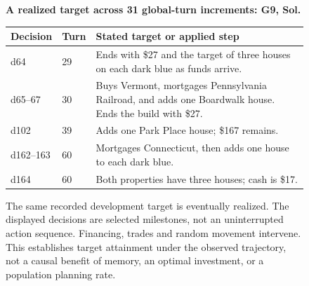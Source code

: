 
\begin{figure}[p]
\centering
\begin{minipage}{0.95\linewidth}
\textbf{A realized target across 31 global-turn increments: G9, Sol.}\par\smallskip
\begin{tabularx}{\linewidth}{@{}llX@{}}
\toprule
Decision & Turn & Stated target or applied step\\
\midrule
d64 & 29 & Ends with \$27 and the target of three houses on each dark blue as funds arrive.\\
d65--67 & 30 & Buys Vermont, mortgages Pennsylvania Railroad, and adds one Boardwalk house. Ends the build with \$27.\\
d102 & 39 & Adds one Park Place house; \$167 remains.\\
d162--163 & 60 & Mortgages Connecticut, then adds one house to each dark blue.\\
d164 & 60 & Both properties have three houses; cash is \$17.\\
\bottomrule
\end{tabularx}
\end{minipage}
\caption{The same recorded development target is eventually realized. The displayed decisions are selected milestones, not an uninterrupted action sequence. Financing, trades and random movement intervene. This establishes target attainment under the observed trajectory, not a causal benefit of memory, an optimal investment, or a population planning rate.}
\label{fig:temporal-target}
\end{figure}

